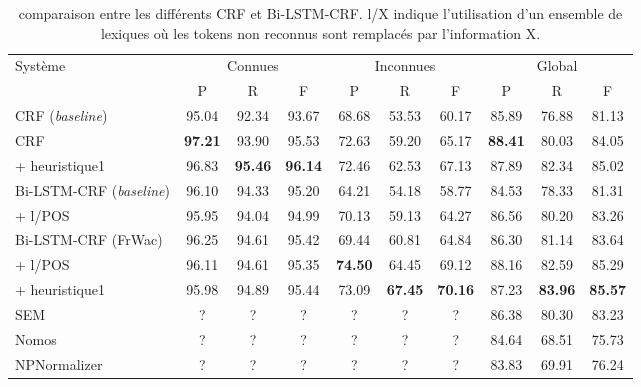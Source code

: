 \documentclass[12pt,a4paper,times,twoside,openright]{report}
\begin{document}
\begin{table}[ht!]
\centering
\footnotesize
\begin{tabular}{|l|ccc|ccc|ccc|}
\hline
\multirow{2}{*}{Système}   & \multicolumn{3}{c|}{Connues} & \multicolumn{3}{c|}{Inconnues} & \multicolumn{3}{c|}{Global}\\
                           & P     & R     & F          & P     & R     & F             & P     & R     & F   \\
\hline
CRF (\emph{baseline})      & 95.04 & 92.34 & 93.67 & 68.68 & 53.53 & 60.17 & 85.89 & 76.88 & 81.13 \\
CRF                        & \textbf{97.21} & 93.90 & 95.53 & 72.63 & 59.20 & 65.17 & \textbf{88.41} & 80.03 & 84.05 \\
+ heuristique1             & 96.83 & \textbf{95.46} & \textbf{96.14} & 72.46 & 62.53 & 67.13 & 87.89 & 82.34 & 85.02 \\
\hline
Bi-LSTM-CRF (\emph{baseline}) & 96.10 & 94.33 & 95.20 & 64.21 & 54.18 & 58.77 & 84.53 & 78.33 & 81.31 \\
+ l/POS                    & 95.95 & 94.04 & 94.99 & 70.13 & 59.13 & 64.27 & 86.56 & 80.20 & 83.26 \\
Bi-LSTM-CRF (FrWac)           & 96.25 & 94.61 & 95.42 & 69.44 & 60.81 & 64.84 & 86.30 & 81.14 & 83.64 \\
+ l/POS                    & 96.11 & 94.61 & 95.35 & \textbf{74.50} & 64.45 & 69.12 & 88.16 & 82.59 & 85.29 \\
+ heuristique1             & 95.98 & 94.89 & 95.44 & 73.09 & \textbf{67.45} & \textbf{70.16} & 87.23 & \textbf{83.96} & \textbf{85.57} \\
\hline
SEM & ? & ? & ? & ? & ? & ? & 86.38 & 80.30 & 83.23 \\
Nomos \citep{stern2013identification} & ? & ? & ? & ? & ? & ? & 84.64 & 68.51 & 75.73 \\
NPNormalizer &  ? & ? & ? & ? & ? & ? & 83.83 & 69.91 & 76.24 \\
\hline
\end{tabular}
\caption{comparaison entre les différents CRF et Bi-LSTM-CRF. l/X indique l'utilisation d'un ensemble de lexiques où les tokens non reconnus sont remplacés par l'information X.}
\label{tab:CRF-vs-LSTM-vs-SEM}
\end{table}
\end{document}
